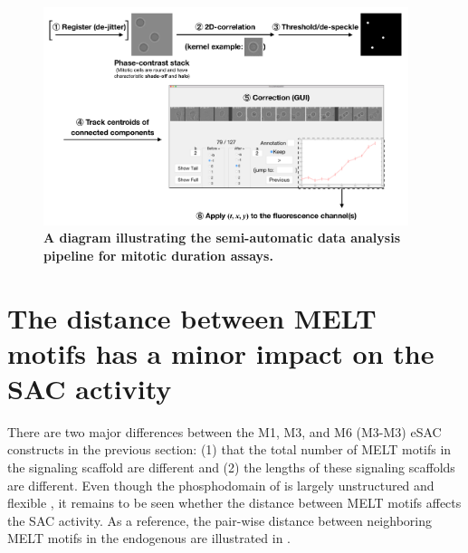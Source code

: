 \begin{figure}
    \centering
    \includegraphics[width=0.95\textwidth]{chapters/figures/DataAnalysisPipeline.pdf}
    \caption{\textbf{A diagram illustrating the semi-automatic data analysis pipeline for mitotic duration assays.}}
    \label{DataAnalysisPipeline}
\end{figure}

\section{The distance between MELT motifs has a minor impact on the SAC activity}
\label{sec:examplesec3}
There are two major differences between the M1, M3, and M6 (M3-M3) eSAC constructs in the previous section: (1) that the total number of MELT motifs in the signaling scaffold are different and (2) the lengths of these signaling scaffolds are different. Even though the phosphodomain of  is largely unstructured and flexible \cite{UnstructuredKNL1}, it remains to be seen whether the distance between MELT motifs affects the SAC activity. As a reference, the pair-wise distance between neighboring MELT motifs in the endogenous  are illustrated in .

